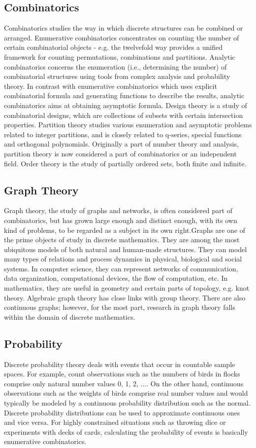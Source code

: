\documentclass{article}
\begin{document}
\subsection{Combinatorics}
Combinatorics studies the way in which discrete structures can be combined or arranged. Enumerative combinatorics concentrates on counting the number of certain combinatorial objects - e.g. the twelvefold way provides a unified framework for counting permutations, combinations and partitions. Analytic combinatorics concerns the enumeration (i.e., determining the number) of combinatorial structures using tools from complex analysis and probability theory. In contrast with enumerative combinatorics which uses explicit combinatorial formula and generating functions to describe the results, analytic combinatorics aims at obtaining asymptotic formula. Design theory is a study of combinatorial designs, which are collections of subsets with certain intersection properties. Partition theory studies various enumeration and asymptotic problems related to integer partitions, and is closely related to q-series, special functions and orthogonal polynomials. Originally a part of number theory and analysis, partition theory is now considered a part of combinatorics or an independent field. Order theory is the study of partially ordered sets, both finite and infinite. 
\subsection{Graph Theory}
Graph theory, the study of graphs and networks, is often considered part of combinatorics, but has grown large enough and distinct enough, with its own kind of problems, to be regarded as a subject in its own right.Graphs are one of the prime objects of study in discrete mathematics. They are among the most ubiquitous models of both natural and human-made structures. They can model many types of relations and process dynamics in physical, biological and social systems. In computer science, they can represent networks of communication, data organization, computational devices, the flow of computation, etc. In mathematics, they are useful in geometry and certain parts of topology, e.g. knot theory. Algebraic graph theory has close links with group theory. There are also continuous graphs; however, for the most part, research in graph theory falls within the domain of discrete mathematics.
\subsection{Probability}
Discrete probability theory deals with events that occur in countable sample spaces. For example, count observations such as the numbers of birds in flocks comprise only natural number values {0, 1, 2, ...}. On the other hand, continuous observations such as the weights of birds comprise real number values and would typically be modeled by a continuous probability distribution such as the normal. Discrete probability distributions can be used to approximate continuous ones and vice versa. For highly constrained situations such as throwing dice or experiments with decks of cards, calculating the probability of events is basically enumerative combinatorics. 
\end{document}
